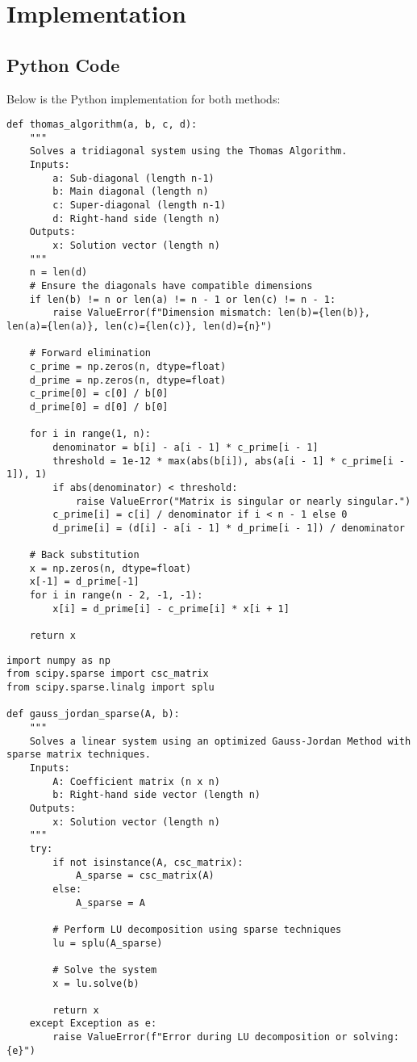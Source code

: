 \documentclass[a4paper,12pt]{article}
\begin{document}
\newpage
\section*{Implementation}
\subsection*{Python Code}
Below is the Python implementation for both methods:

\lstset{language=Python, basicstyle=\ttfamily, breaklines=true}
\begin{lstlisting}[caption={Thomas Algorithm Implementation}]
def thomas_algorithm(a, b, c, d):
    """
    Solves a tridiagonal system using the Thomas Algorithm.
    Inputs:
        a: Sub-diagonal (length n-1)
        b: Main diagonal (length n)
        c: Super-diagonal (length n-1)
        d: Right-hand side (length n)
    Outputs:
        x: Solution vector (length n)
    """
    n = len(d)
    # Ensure the diagonals have compatible dimensions
    if len(b) != n or len(a) != n - 1 or len(c) != n - 1:
        raise ValueError(f"Dimension mismatch: len(b)={len(b)}, len(a)={len(a)}, len(c)={len(c)}, len(d)={n}")

    # Forward elimination
    c_prime = np.zeros(n, dtype=float)
    d_prime = np.zeros(n, dtype=float)
    c_prime[0] = c[0] / b[0]
    d_prime[0] = d[0] / b[0]

    for i in range(1, n):
        denominator = b[i] - a[i - 1] * c_prime[i - 1]
        threshold = 1e-12 * max(abs(b[i]), abs(a[i - 1] * c_prime[i - 1]), 1)
        if abs(denominator) < threshold:
            raise ValueError("Matrix is singular or nearly singular.")
        c_prime[i] = c[i] / denominator if i < n - 1 else 0
        d_prime[i] = (d[i] - a[i - 1] * d_prime[i - 1]) / denominator

    # Back substitution
    x = np.zeros(n, dtype=float)
    x[-1] = d_prime[-1]
    for i in range(n - 2, -1, -1):
        x[i] = d_prime[i] - c_prime[i] * x[i + 1]

    return x
\end{lstlisting}

\begin{lstlisting}[caption={Gauss-Jordan Method Implementation}]
import numpy as np
from scipy.sparse import csc_matrix
from scipy.sparse.linalg import splu

def gauss_jordan_sparse(A, b):
    """
    Solves a linear system using an optimized Gauss-Jordan Method with sparse matrix techniques.
    Inputs:
        A: Coefficient matrix (n x n)
        b: Right-hand side vector (length n)
    Outputs:
        x: Solution vector (length n)
    """
    try:
        if not isinstance(A, csc_matrix):
            A_sparse = csc_matrix(A)
        else:
            A_sparse = A

        # Perform LU decomposition using sparse techniques
        lu = splu(A_sparse)

        # Solve the system
        x = lu.solve(b)

        return x
    except Exception as e:
        raise ValueError(f"Error during LU decomposition or solving: {e}")
\end{lstlisting}
\end{document}
